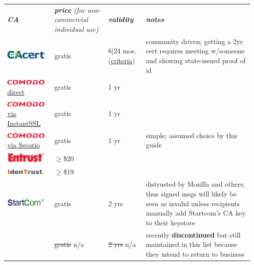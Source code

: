 \documentclass[pdftex,12pt,titlepage=false]{scrartcl}
\newcommand{\secorio}{\href{https://www.secorio.com/}{\includegraphics[width=2cm]{images/logo_comodo.png}\tiny via Secorio}}
\begin{document}
\begin{tabular}{m{38mm}p{2.3cm}l>{\tiny}p{}}
  \slshape\textbf{CA}
  & \slshape\textbf{price} \newline\tiny(for non-commercial individual use)
  & \slshape\textbf{validity}
  & \slshape\normalsize\textbf{notes}\\
  \href{https://www.cacert.org/}{\includegraphics[width=2cm]{images/logo_cacert4.png}} & gratis & 6|24 mos.\tiny (\href{http://wiki.cacert.org/FAQ/Privileges}{criteria}) & community driven; getting a 2yr cert requires meeting w/someone and showing state-issued proof of id\\
  \href{https://secure.comodo.com/products/frontpage?area=SecureEmailCertificate}{\includegraphics[width=2cm]{images/logo_comodo.png}\tiny direct} & gratis & 1 yr &\\
  \href{https://www.instantssl.com/ssl-certificate-products/free-email-certificate.html}{\includegraphics[width=2cm]{images/logo_comodo.png}\tiny via InstantSSL} & gratis & 1 yr &\\
  \secorio & gratis & 1 yr & simple; assumed choice by this guide\\
  \href{https://www.entrust.com/secure-email-certificates/}{\includegraphics[width=2cm]{images/logo_entrust.png}} & $\geq$\$20 & &\\
  \href{https://www.identrust.com/certificates/trustid.html}{\includegraphics[width=2cm]{images/logo_trustid.png}} & $\geq$\$19 & &\\
  \href{https://www.startcomca.com/}{\includegraphics[width=2cm]{images/logo_startcom.png}} & gratis & 2 yrs & distrusted by Mozilla and others, thus signed msgs will likely be seen as invalid unless recipients manually add Startcom's CA key to their keystore\\
  \href{https://buy.wosign.com/free/}{\begin{overpic}[width=2cm]{images/logo_wosign.png}\put(-5,10){\color{black}\rule{24mm}{1pt}}\end{overpic}} & \st{gratis} n/a & \st{2 yrs} n/a & recently \textbf{discontinued} but still maintained in this list because they intend to return to business\\
\end{tabular}\\
\end{document}
